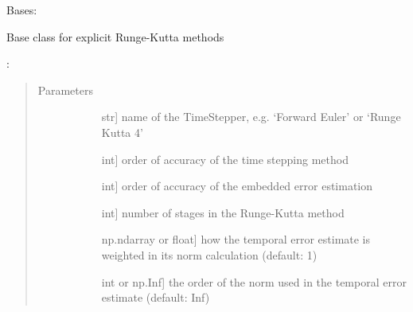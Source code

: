 \documentclass[letterpaper,10pt,english]{sphinxmanual}
\begin{document}

\begin{fulllineitems}
\label{\detokenize{spitfire.time.methods:spitfire.time.methods.AdaptiveExplicitRungeKutta}}
Bases: {\hyperref[\detokenize{spitfire.time.methods:spitfire.time.methods.ExplicitRungeKutta}]{}}

Base class for explicit Runge-Kutta methods

:
\begin{quote}\begin{description}
\item[{Parameters}] \leavevmode\begin{description}
\item[{}] \leavevmode{[}str{]}
name of the TimeStepper, e.g. ‘Forward Euler’ or ‘Runge Kutta 4’

\item[{}] \leavevmode{[}int{]}
order of accuracy of the time stepping method

\item[{}] \leavevmode{[}int{]}
order of accuracy of the embedded error estimation

\item[{}] \leavevmode{[}int{]}
number of stages in the Runge-Kutta method

\item[{}] \leavevmode{[}np.ndarray or float{]}
how the temporal error estimate is weighted in its norm calculation (default: 1)

\item[{}] \leavevmode{[}int or np.Inf{]}
the order of the norm used in the temporal error estimate (default: Inf)

\end{description}

\end{description}\end{quote}


\end{fulllineitems}
\end{document}
